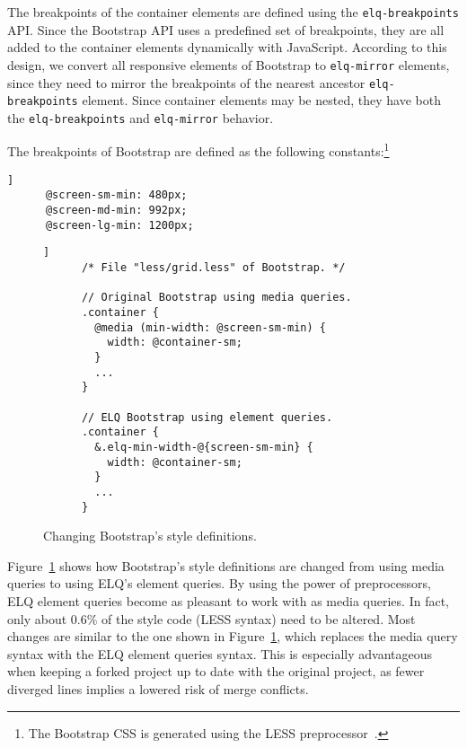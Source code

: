 \documentclass[sigplan,9pt]{acmart}
\newcommand{\elq}{ELQ}
\newcommand{\code}[1]{\texttt{#1}}
\begin{document}
    The breakpoints of the container elements are defined using the \code{elq-breakpoints} API.
    Since the Bootstrap API uses a predefined set of breakpoints, they are all added to the container elements dynamically with JavaScript.
    According to this design, we convert all responsive elements of Bootstrap to \code{elq-mirror} elements, since they need to mirror the breakpoints of the nearest ancestor \code{elq-breakpoints} element.
    Since container elements may be nested, they have both the \code{elq-breakpoints} and \code{elq-mirror} behavior.

    The breakpoints of Bootstrap are defined as the following constants:\footnote{The Bootstrap CSS is generated using the LESS preprocessor~\cite{lesscss}.}
    \begin{lstlisting}[gobble=6,label={code:bootstrap-less-breakpoints},caption={},captionpos=b]]
      @screen-sm-min: 480px;
      @screen-md-min: 992px;
      @screen-lg-min: 1200px;
    \end{lstlisting}

    \begin{figure}
    \begin{lstlisting}[gobble=6,label={code:bootstrap-less-breakpoints-usage},caption={},captionpos=b]]
      /* File "less/grid.less" of Bootstrap. */

      // Original Bootstrap using media queries.
      .container {
        @media (min-width: @screen-sm-min) {
          width: @container-sm;
        }
        ...
      }

      // ELQ Bootstrap using element queries.
      .container {
        &.elq-min-width-@{screen-sm-min} {
          width: @container-sm;
        }
        ...
      }
    \end{lstlisting}
    \caption{Changing Bootstrap's style definitions.}\label{fig:bootstrap}
    \end{figure}

    Figure~\ref{fig:bootstrap} shows how Bootstrap's style definitions are changed from using media queries to using \elq{}'s element queries.
    By using the power of preprocessors, \elq{} element queries become as pleasant to work with as media queries.
    In fact, only about 0.6\% of the style code (LESS syntax) need to be altered.
    Most changes are similar to the one shown in Figure~\ref{fig:bootstrap}, which replaces the media query syntax with the \elq{} element queries syntax.
    This is especially advantageous when keeping a forked project up to date with the original project, as fewer diverged lines implies a lowered risk of merge conflicts.
\end{document}
